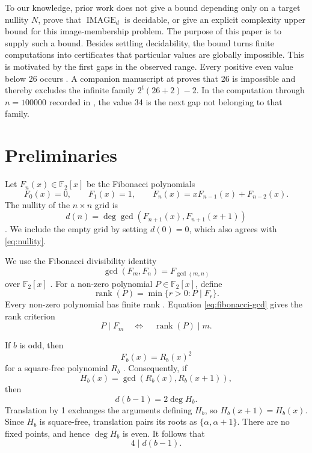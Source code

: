 \documentclass[a4paper]{article}
\newcommand{\F}{\mathbb{F}}
\DeclareMathOperator{\rank}{rank}
\begin{document}
To our knowledge, prior work does not give a bound depending only on a
target nullity $N$, prove that $\operatorname{IMAGE}_d$ is decidable, or
give an explicit complexity upper bound for this image-membership problem.
The purpose of this paper is to supply such a bound.
Besides settling decidability, the bound turns finite computations into
certificates that particular values are globally impossible.
This is motivated by the first gaps in the observed range.
Every positive even value below 26 occurs \cite{OEISA159257}.
A companion manuscript at 
proves that 26 is impossible and thereby excludes the infinite family
$2^t(26+2)-2$.
In the computation through $n=100000$ recorded in
, the value 34 is the next gap not
belonging to that family.

\section{Preliminaries}

Let $F_n(x)\in\F_2[x]$ be the Fibonacci polynomials
\[
	F_0(x)=0,\qquad F_1(x)=1,\qquad
	F_n(x)=xF_{n-1}(x)+F_{n-2}(x).
\]
The nullity of the $n\times n$ grid is
\begin{equation}\label{eq:nullity}
	d(n)=
	\deg\gcd\!\left(F_{n+1}(x),F_{n+1}(x+1)\right)
\end{equation}
\cite{Sutner00sigma-automataand}.
We include the empty grid by setting $d(0)=0$, which also agrees with
\eqref{eq:nullity}.

We use the Fibonacci divisibility identity
\begin{equation}\label{eq:fibonacci-gcd}
	\gcd(F_m,F_n)=F_{\gcd(m,n)}
\end{equation}
over $\F_2[x]$ \cite{HUNZIKER2004465}.
For a non-zero polynomial $P\in\F_2[x]$, define
\[
	\rank(P)=\min\{r>0:P\mid F_r\}.
\]
Every non-zero polynomial has finite rank \cite{HUNZIKER2004465}.
Equation \eqref{eq:fibonacci-gcd} gives the rank criterion
\begin{equation}\label{eq:rank-criterion}
	P\mid F_m
	\quad\Longleftrightarrow\quad
	\rank(P)\mid m.
\end{equation}

If $b$ is odd, then
\begin{equation}\label{eq:square-free-root}
	F_b(x)=R_b(x)^2
\end{equation}
for a square-free polynomial $R_b$ \cite{HUNZIKER2004465}.
Consequently, if
\[
	H_b(x)=\gcd(R_b(x),R_b(x+1)),
\]
then
\begin{equation}\label{eq:base-nullity}
	d(b-1)=2\deg H_b.
\end{equation}
Translation by 1 exchanges the arguments defining $H_b$, so
$H_b(x+1)=H_b(x)$.
Since $H_b$ is square-free, translation pairs its roots as
$\{\alpha,\alpha+1\}$.
There are no fixed points, and hence $\deg H_b$ is even.
It follows that
\begin{equation}\label{eq:even-base-divisibility}
	4\mid d(b-1).
\end{equation}
\end{document}
